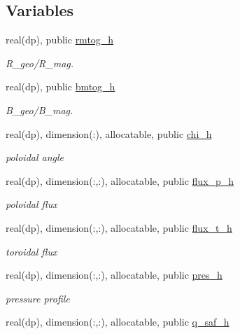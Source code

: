 \subsection*{Variables}
\begin{DoxyCompactItemize}
\item 
real(dp), public \hyperlink{namespacehelena__vars_ae7f70e6b0e2babde94c88cd5141a215e}{rmtog\+\_\+h}
\begin{DoxyCompactList}\small\item\em R\+\_\+geo/\+R\+\_\+mag. \end{DoxyCompactList}\item 
real(dp), public \hyperlink{namespacehelena__vars_aab2e408c4a8677843633d486dc216dfe}{bmtog\+\_\+h}
\begin{DoxyCompactList}\small\item\em B\+\_\+geo/\+B\+\_\+mag. \end{DoxyCompactList}\item 
real(dp), dimension(\+:), allocatable, public \hyperlink{namespacehelena__vars_aaaa83af362a93836b4dc74bdfa715d1a}{chi\+\_\+h}
\begin{DoxyCompactList}\small\item\em poloidal angle \end{DoxyCompactList}\item 
real(dp), dimension(\+:,\+:), allocatable, public \hyperlink{namespacehelena__vars_ab84791cf288fa3209eafb797479d1e47}{flux\+\_\+p\+\_\+h}
\begin{DoxyCompactList}\small\item\em poloidal flux \end{DoxyCompactList}\item 
real(dp), dimension(\+:,\+:), allocatable, public \hyperlink{namespacehelena__vars_af28db18d415da215cae4d9ec9f60e18b}{flux\+\_\+t\+\_\+h}
\begin{DoxyCompactList}\small\item\em toroidal flux \end{DoxyCompactList}\item 
real(dp), dimension(\+:,\+:), allocatable, public \hyperlink{namespacehelena__vars_a3c258f679dc87684823f378abdc851f0}{pres\+\_\+h}
\begin{DoxyCompactList}\small\item\em pressure profile \end{DoxyCompactList}\item 
real(dp), dimension(\+:,\+:), allocatable, public \hyperlink{namespacehelena__vars_a95906460e4a767f4dd020100b93a631c}{q\+\_\+saf\+\_\+h}

\end{DoxyCompactItemize}
